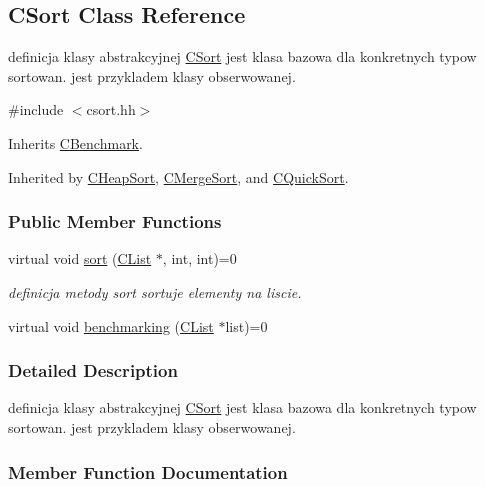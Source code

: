 \hypertarget{class_c_sort}{}\subsection{C\+Sort Class Reference}
\label{class_c_sort}


definicja klasy abstrakcyjnej \hyperlink{class_c_sort}{C\+Sort} jest klasa bazowa dla konkretnych typow sortowan. jest przykladem klasy obserwowanej.  




{\ttfamily \#include $<$csort.\+hh$>$}



Inherits \hyperlink{class_c_benchmark}{C\+Benchmark}.



Inherited by \hyperlink{class_c_heap_sort}{C\+Heap\+Sort}, \hyperlink{class_c_merge_sort}{C\+Merge\+Sort}, and \hyperlink{class_c_quick_sort}{C\+Quick\+Sort}.

\subsubsection*{Public Member Functions}
\begin{DoxyCompactItemize}
\item 
virtual void \hyperlink{class_c_sort_a2c87a533501c9e2102444e4ce6b69527}{sort} (\hyperlink{class_c_list}{C\+List} $\ast$, int, int)=0
\begin{DoxyCompactList}\small\item\em definicja metody sort sortuje elementy na liscie. \end{DoxyCompactList}\item 
virtual void \hyperlink{class_c_sort_a600cf20261b3e00b148f8d4b773dd1b9}{benchmarking} (\hyperlink{class_c_list}{C\+List} $\ast$list)=0
\end{DoxyCompactItemize}


\subsubsection{Detailed Description}
definicja klasy abstrakcyjnej \hyperlink{class_c_sort}{C\+Sort} jest klasa bazowa dla konkretnych typow sortowan. jest przykladem klasy obserwowanej. 

\subsubsection{Member Function Documentation}
\hypertarget{class_c_sort_a600cf20261b3e00b148f8d4b773dd1b9}{}
